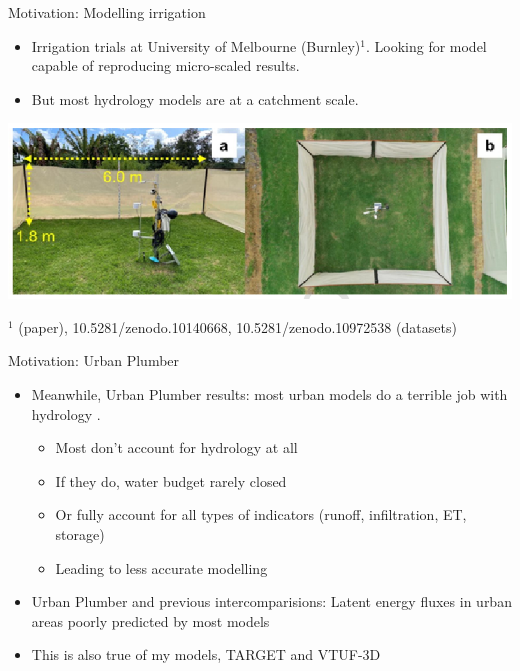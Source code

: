 \documentclass{beamer}
\begin{document}
\begin{frame}{Motivation: Modelling irrigation} 

\begin{itemize}
\item Irrigation trials at University of Melbourne (Burnley)$^{1}$. Looking for model capable of reproducing micro-scaled results.\\ 
\item But most hydrology models are at a catchment scale.
\end{itemize}
\begin{center}
\includegraphics[scale=0.60]{Screenshot_20250703_100546.png}
\end{center}
$^{1}${\footnotesize \cite{Cheung2024} (paper), 10.5281/zenodo.10140668, 10.5281/zenodo.10972538 (datasets)}
\end{frame}






\begin{frame}{Motivation: Urban Plumber} 
\begin{itemize}

\item Meanwhile, Urban Plumber results: most urban models do a terrible job with hydrology {\footnotesize \citep{jongen_water_2024}}.
\begin{itemize}
\item Most don't account for hydrology at all
\item If they do, water budget rarely closed
\item Or fully account for all types of indicators (runoff, infiltration, ET, storage)
\item Leading to less accurate modelling
\end{itemize}
\item Urban Plumber and previous intercomparisions: Latent energy fluxes in urban areas poorly predicted by most models {\footnotesize \citep{lipson_evaluation_2024,grimmond_initial_2011}}
\item This is also true of my models, TARGET and VTUF-3D \citep{Nice2018}
\end{itemize}
\end{frame}
\end{document}
